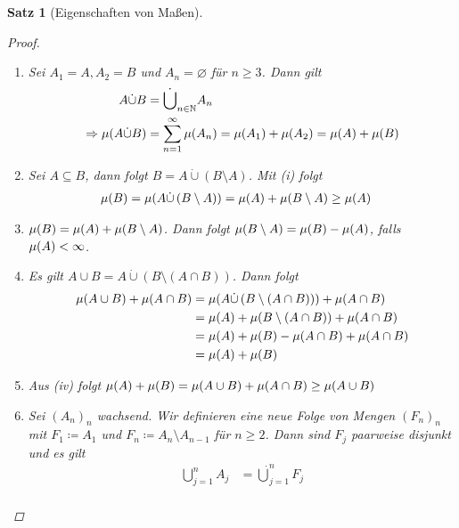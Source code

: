 \documentclass[11pt, twoside, a4paper]{article}
\theoremstyle{plain}
\newtheorem{satz}[blockelement]{Satz}
\numberwithin{equation}{subsection}
\newcommand{\pair}[1]{\left(#1\right)}
\newcommand{\of}[1]{\mathopen{}\mathclose{}\bgroup\left(#1\aftergroup\egroup\right)}
\newcommand{\impl}[0]{\Rightarrow{}}
\renewcommand{\emptyset}{\varnothing}
\newcommand{\theoremescape}{\leavevmode}
\newcommand{\N}{\mathbb{N}}
\begin{document}
\begin{satz}[Eigenschaften von Maßen]
        \begin{proof}
            \theoremescape
            \begin{enumerate}[label=(\roman*)]
                \item Sei $A_1 = A, A_2 = B$ und $A_n = \emptyset$ für $n\geq 3$. Dann gilt
                \begin{align*}
                    A \dot\cup B &= \dot\bigcup_{n\in\N} A_n\\
                    \impl \mu\of{A\dot\cup B} &= \sum_{n=1}^{\infty} \mu\of{A_n} = \mu\of{A_1} + \mu\of{A_2} = \mu\of{A} + \mu\of{B}
                \end{align*}
                \item Sei $A \subseteq B$, dann folgt $B = A \dot\cup \pair{B\setminus A}$. Mit (i) folgt
                \begin{align*}
                    \mu\of{B} &= \mu\of{A \dot\cup \pair{B\setminus A}} = \mu\of{A} + \mu\of{B\setminus A} \geq \mu\of{A}
                \end{align*}
                \item $\mu\of{B} = \mu\of{A} + \mu\of{B\setminus A}$. Dann folgt $\mu\of{B\setminus A} = \mu\of{B} - \mu\of{A}$, falls $\mu\of{A} < \infty$.
                \item Es gilt $A \cup B = A \dot\cup \pair{B\setminus\pair{A \cap B}}$. Dann folgt
                \begin{align*}
                    \mu\of{A \cup B} + \mu\of{A\cap B} &= \mu\of{A\dot\cup\pair{B\setminus\pair{A\cap B}}} + \mu\of{A \cap B}\\
                    &= \mu\of{A} + \mu\of{B\setminus \pair{A\cap B}} + \mu\of{A \cap B}\\
                    &= \mu\of{A} + \mu\of{B} - \mu\of{A \cap B} + \mu\of{A \cap B}\\
                    &= \mu\of{A} + \mu\of{B}
                \end{align*}
                \item Aus (iv) folgt $\mu\of{A} + \mu\of{B} = \mu\of{A\cup B} + \mu\of{A \cap B} \geq \mu\of{A \cup B}$
                \item Sei $(A_n)_n$ wachsend. Wir definieren eine neue Folge von Mengen $(F_n)_n$ mit $F_1 \coloneqq A_1$ und $F_n \coloneqq A_n \setminus A_{n-1}$ für $n\geq 2$. Dann sind $F_j$ paarweise disjunkt und es gilt
                \begin{align*}
                    \bigcup_{j=1}^{n} A_j &= \dot\bigcup_{j=1}^{n} F_j\\

\end{align*}
\end{enumerate}
\end{proof}
\end{satz}
\end{document}
